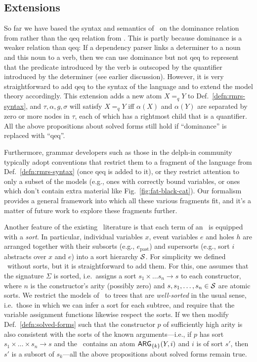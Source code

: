 \subsection{Extensions}
\label{sec:extensions}

So far we have based the syntax and semantics of \rmrs\ on the
dominance relation from  rather than the qeq
relation from .  This is partly because
dominance is a weaker relation than qeq: If a dependency parser links
a determiner to a noun and this noun to a verb, then we can use
dominance but not qeq to represent that the predicate introduced by
the verb is outscoped by the quantifier introduced by the determiner
(see earlier discussion).  However, it is very straightforward to add
qeq to the syntax of the language and to extend the model theory
accordingly.  This extension adds a new atom $X=_q Y$ to
Def.~\ref{defn:rmrs-syntax}, and $\tau,\alpha,g,\sigma$ will satisfy
$X=_q Y$ iff $\alpha(X)$ and $\alpha(Y)$ are separated by zero or more
nodes in $\tau$, each of which has a rightmost child that is a
quantifier. All the above propositions about solved forms still hold
if ``dominance'' is replaced with ``qeq''.

Furthermore, grammar developers such as those in the {\sc delph-in}
community typically adopt conventions that restrict them to a fragment
of the language from Def.~\ref{defn:rmrs-syntax} (once qeq is added to
it), or they restrict attention to only a subset of the models (e.g.,
ones with correctly bound variables, or ones which don't contain extra
material like Fig.~\ref{fig:fat-black-cat}).  Our formalism provides a
general framework into which all these various fragments fit, and it's
a matter of future work to explore these fragments further.

Another feature of the existing \rmrs\ literature is that each term of
an \rmrs\ is equipped with a \emph{sort}.  In particular, individual
variables $x$, event variables $e$ and holes $h$ are arranged together
with their subsorts (e.g., $e_{\mbox{past}}$) and supersorts (e.g.,
sort $i$ abstracts over $x$ and $e$) into a
sort hierarchy ${\cal S}$. 
For simplicity we defined \rmrs\ without sorts, but it is
straightforward to add them.  For this, one
assumes that the signature $\Sigma$ is sorted, i.e.\ assigns a sort
$s_1\times\ldots s_n\rightarrow s$ to each constructor, where $n$ is
the constructor's arity (possibly zero) and $s,s_1,\ldots,s_n\in {\cal
  S}$ are atomic sorts.  We restrict the models of \rmrs\ to trees
that are \emph{well-sorted} in the usual sense, i.e.\ those in which
we can infer a sort for each subtree, and require that the variable
assignment functions likewise respect the sorts.  If we then modify
Def.~\ref{defn:solved-forms} such that the constructor $p$ of
sufficiently high arity is also consistent with the sorts of the known
arguments---i.e., if $p$ has sort $s_1 \times \ldots \times s_n
\rightarrow s$ and the \rmrs\ contains an atom $\mathsf{ARG}_{\{k\}}(Y,i)$ and
$i$ is of sort $s'$, then $s'$ is a subsort of $s_k$---all the above
propositions about solved forms remain true.



